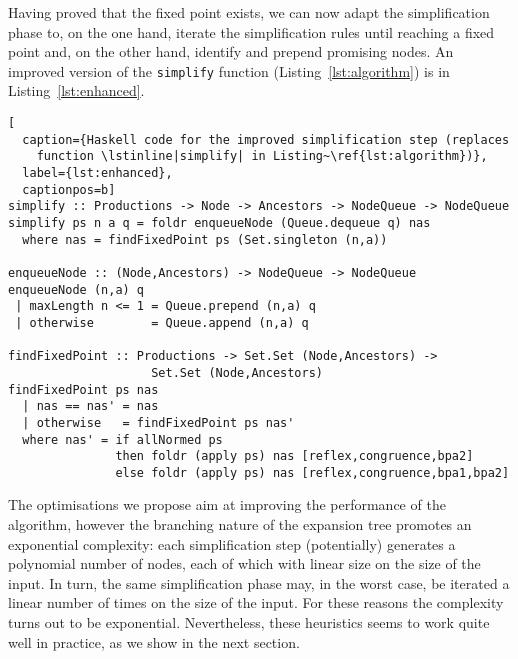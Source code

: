 Having proved that the fixed point exists, we can now adapt the
simplification phase to, on the one hand, iterate the simplification
rules until reaching a fixed point and, on the other hand, identify
and prepend promising nodes. An improved version of the
\lstinline|simplify| function (Listing~\ref{lst:algorithm}) is in
Listing~\ref{lst:enhanced}.

\begin{lstlisting}[
  caption={Haskell code for the improved simplification step (replaces
    function \lstinline|simplify| in Listing~\ref{lst:algorithm})},
  label={lst:enhanced},
  captionpos=b]
simplify :: Productions -> Node -> Ancestors -> NodeQueue -> NodeQueue
simplify ps n a q = foldr enqueueNode (Queue.dequeue q) nas
  where nas = findFixedPoint ps (Set.singleton (n,a))

enqueueNode :: (Node,Ancestors) -> NodeQueue -> NodeQueue
enqueueNode (n,a) q
 | maxLength n <= 1 = Queue.prepend (n,a) q
 | otherwise        = Queue.append (n,a) q

findFixedPoint :: Productions -> Set.Set (Node,Ancestors) -> 
                    Set.Set (Node,Ancestors)
findFixedPoint ps nas
  | nas == nas' = nas
  | otherwise   = findFixedPoint ps nas'
  where nas' = if allNormed ps
               then foldr (apply ps) nas [reflex,congruence,bpa2]
               else foldr (apply ps) nas [reflex,congruence,bpa1,bpa2]
\end{lstlisting}

The optimisations we propose aim at improving the performance of the
algorithm, however the branching nature of the expansion tree promotes
an exponential complexity: each simplification step (potentially)
generates a polynomial number of nodes, each of which with linear size
on the size of the input.  In turn, the same simplification phase may,
in the worst case, be iterated a linear number of times on the size of
the input.  For these reasons the complexity turns out to be
exponential.  Nevertheless, these heuristics seems to work quite well
in practice, as we show in the next section.

